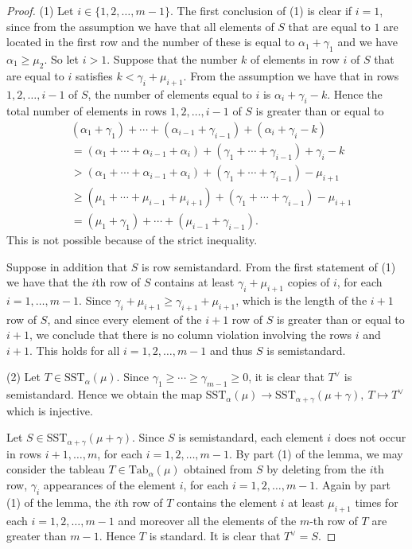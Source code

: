 \documentclass[11pt]{article}
\theoremstyle{definition}
\numberwithin{equation}{section}
\newcommand{\al}{\alpha}
\numberwithin{equation}{section}
\begin{document}
		\begin{proof}(1) Let $i \in \{1,2,\dots,m-1\}$. The first conclusion of (1) is clear if $i=1$, since from the assumption we have that all elements of $S$ that are equal to $1$ are located in the first row and the number of these is equal to $\al_1+\gamma_1 $ and we have  $\al_1 \ge \mu_2$. So let $i>1$. Suppose that the number $k$ of elements in row $i$ of  $S$ that are equal to $i$ satisfies $k<\gamma_i +\mu_{i+1}$. From the assumption we have that in rows $1,2,\dots,i-1$ of $S$, the number of elements equal to $i$ is $\al_i+\gamma_i-k$. Hence the total number of elements in rows $1,2,\dots, i-1$ of $S$ is greater than or equal to \begin{align*}
				&(\al_1 +\gamma_1) + \cdots + (\al_{i-1}+\gamma_{i-1})+(\al_i+\gamma_i-k) \\&=(\al_1+\cdots+\al_{i-1}+\al_i) +(\gamma_1+\cdots+\gamma_{i-1})+\gamma_i-k \\ &>(\al_1+\cdots+\al_{i-1}+\al_i) +(\gamma_1+\cdots+\gamma_{i-1})-\mu_{i+1} \\ &\ge (\mu_1+\cdots+\mu_{i-1}+\mu_{i+1})+(\gamma_1+\cdots+\gamma_{i-1})-\mu_{i+1}\\&=(\mu_1+\gamma_1)+\cdots+(\mu_{i-1}+\gamma_{i-1}).\end{align*} This is not possible because of the strict inequality.
			
			Suppose in addition that $S$ is row semistandard. From the first statement of (1) we have that the $i$th row of $S$ contains at least $\gamma_i + \mu_{i+1}$ copies of $i$, for each $i=1,\dots,m-1$. Since $\gamma_i + \mu_{i+1} \ge \gamma_{i+1}+\mu_{i+1}$, which is the length of the $i+1$ row of $S$, and since every element of the $i+1$ row of $S$ is greater than or equal to $i+1$, we conclude that there is no column violation involving the rows $i$ and $i+1$. This holds for all $i=1,2,\dots,m-1$ and thus $S$ is semistandard.
			
			(2) Let $T \in \mathrm{SST}_{\al}(\mu)$. Since $\gamma_1 \ge \cdots \ge \gamma_{m-1} \ge 0$, it is clear that $T^{\vee}$ is semistandard. Hence we obtain the map $\mathrm{SST}_{\al}(\mu) \to \mathrm{SST}_{\al+\gamma}(\mu+\gamma), \ T \mapsto T^{\vee}$ which is injective.
			
			Let  $S \in \mathrm{SST}_{\al+\gamma}(\mu+\gamma)$. Since $S$ is semistandard, each element $i$ does not occur in rows $i+1,\dots,m$, for each $i=1,2,\dots,m-1$. By part (1) of the lemma, we may consider the tableau $T \in \mathrm{Tab}_\al(\mu)$ obtained from $S$ by deleting from the $i$th row, $\gamma_i$ appearances of the element $i$, for each $i=1,2,\dots,m-1$. Again by part (1) of the lemma, the $i$th row of $T$ contains the element $i$ at least $\mu_{i+1}$ times for each $i=1,2,\dots,m-1$ and moreover all the elements of the $m$-th row of $T$ are greater than $m-1$. Hence $T$ is standard. It is clear that $T^{\vee}=S$.
		\end{proof}
		
\end{document}

